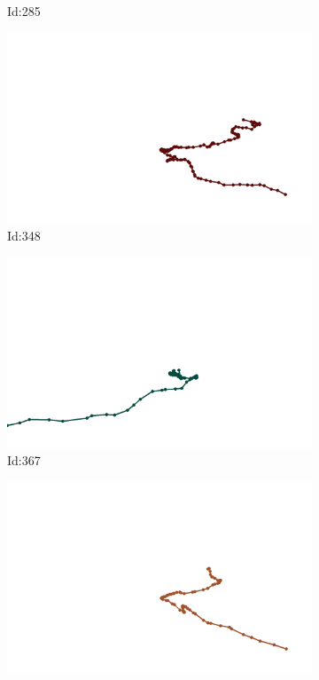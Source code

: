 \documentclass[12pt,twoside]{report}
\begin{document}
\begin{figure}
\begin{subfigure}[b]{0.20\textwidth}
\caption{Id:285}
\end{subfigure}
\begin{subfigure}[b]{0.20\textwidth}
\centering
\includegraphics[width=\textwidth]{../../trajectories/348.png}
\caption{Id:348}
\end{subfigure}
\begin{subfigure}[b]{0.20\textwidth}
\centering
\includegraphics[width=\textwidth]{../../trajectories/367.png}
\caption{Id:367}
\end{subfigure}
\begin{subfigure}[b]{0.20\textwidth}
\centering
\includegraphics[width=\textwidth]{../../trajectories/373.png}

\end{subfigure}
\end{figure}
\end{document}
